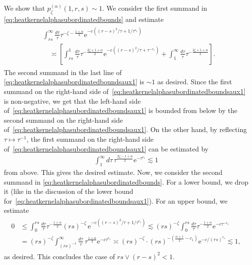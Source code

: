 \documentclass[12pt,reqno,a4paper]{amsart}
\theoremstyle{definition}
\theoremstyle{remark}
\numberwithin{equation}{section}
\newcommand{\1}{\mathbbm{1}}
\newcommand{\me}[1]{\mathrm{e}^{#1}}
\begin{document}
We show that $p_\zeta^{(\alpha)}(1,r,s)\sim1$. We consider the first summand in \eqref{eq:heatkernelalphasubordinatedbounds} and estimate
\begin{align}
  \label{eq:heatkernelalphasubordinatedboundsaux1}
  \begin{split}
    & \int_{rs}^\infty \frac{d\tau}{\tau} \tau^{-\zeta-\frac{1+\alpha}{2}} \me{-c((r-s)^2/\tau + 1/\tau^{c_1})} \\
    & \quad \asymp \left[\int_{rs}^1 \frac{d\tau}{\tau} \tau^{-\frac{2\zeta+1+\alpha}{2}} \me{-c((r-s)^2/\tau+\tau^{-c_1})} + \int_{1}^\infty \frac{d\tau}{\tau} \tau^{-\frac{2\zeta+1+\alpha}{2}}\right].
  \end{split}
\end{align}
The second summand in the last line of \eqref{eq:heatkernelalphasubordinatedboundsaux1} is $\sim1$ as desired. Since the first summand on the right-hand side of~\eqref{eq:heatkernelalphasubordinatedboundsaux1} is non-negative, we get that the left-hand side of~\eqref{eq:heatkernelalphasubordinatedboundsaux1} is bounded from below by the second summand on the right-hand side of~\eqref{eq:heatkernelalphasubordinatedboundsaux1}. On the other hand, by reflecting $\tau\mapsto\tau^{-1}$, the first summand on the right-hand side of~\eqref{eq:heatkernelalphasubordinatedboundsaux1} can be estimated by
\begin{align}
  \int_1^{\infty}d\tau\, \tau^{\frac{2\zeta-1+\alpha}{2}} \me{-\tau^{c_1}}
  \lesssim 1
\end{align}
from above. This gives the desired estimate. Now, we consider the second summand in \eqref{eq:heatkernelalphasubordinatedbounds}. For a lower bound, we drop it (like in the discussion of the lower bound for~\eqref{eq:heatkernelalphasubordinatedboundsaux1}). For an upper bound, we estimate
\begin{align}
  \label{eq:heatkernelalphasubordinatedboundsaux2}
  \begin{split}
    0 & \leq \int_{0}^{rs} \frac{d\tau}{\tau} \tau^{-\frac{1+\alpha}{2}} (rs)^{-\zeta}\, \me{-c((r-s)^2/\tau + 1/\tau^{c_1})}
        \lesssim (rs)^{-\zeta} \int_0^{rs} \frac{d\tau}{\tau} \tau^{-\frac{1+\alpha}{2}}\me{-c\tau^{-c_1}}\\
      & = (rs)^{-\zeta} \int_{(rs)^{-1}}^\infty \frac{d\tau}{\tau}\, \tau^{\frac{1+\alpha}{2}}\me{-c\tau^{c_1}}
        \asymp (rs)^{-\zeta} \cdot  (rs)^{-(\frac{\alpha+1}{2}-c_1)}\me{-c/(rs)^{c_1}}
        \lesssim 1,
  \end{split}
\end{align}
as desired. This concludes the case of $rs\vee(r-s)^2<1$.
\end{document}
